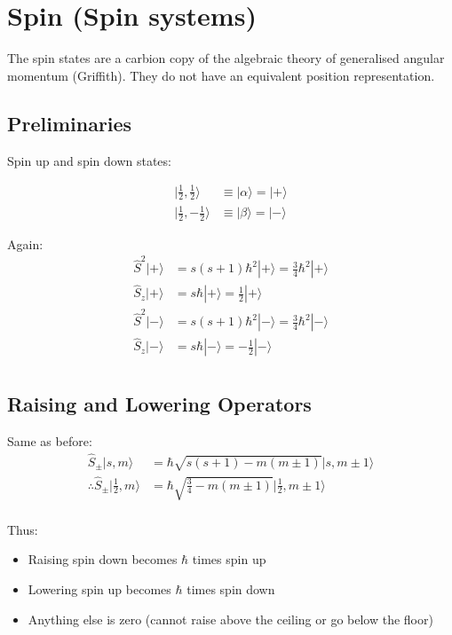 \documentclass[11pt]{article}
\begin{document}
\section{Spin (Spin \textonehalf{} systems)}
\label{sec:orgda054f5}

The spin states are a carbion copy of the algebraic theory of
generalised angular momentum (Griffith). They do not have an
equivalent position representation. 


\subsection{Preliminaries}
\label{sec:org7459ef0}

Spin up and spin down states:

\begin{align*}
 | \frac12, \frac12 \rangle &\equiv |\alpha\rangle  = |+\rangle\\
 | \frac12, -\frac12 \rangle &\equiv |\beta \rangle = |-\rangle
\end{align*}

Again:
\begin{align*}
\hat{S}^2 |+\rangle &= s(s+1)\hbar^2|+\rangle = \frac34\hbar^2|+\rangle\\
\hat{S}_z |+\rangle &= s\hbar|+\rangle = \frac12|+\rangle\\
\hat{S}^2 |-\rangle &= s(s+1)\hbar^2|-\rangle = \frac34\hbar^2|-\rangle\\
\hat{S}_z |-\rangle &= s\hbar|-\rangle = -\frac12|-\rangle\\
\end{align*}

\subsection{Raising and Lowering Operators}
\label{sec:orgfadefcb}

Same as before:
\begin{align*}
\hat{S}_\pm|s,m\rangle &= \hbar\sqrt{s(s+1)-m(m\pm1)}|s,m\pm1\rangle\\
\therefore \hat{S}_\pm|\frac12,m\rangle &= \hbar\sqrt{\frac34-m(m\pm1)}|\frac12,m\pm1\rangle\\
\end{align*}

Thus: 
\begin{itemize}
\item Raising spin down becomes \(\hbar\) times spin up
\item Lowering spin up becomes \(\hbar\) times spin down
\item Anything else is zero (cannot raise above the ceiling or go below
the floor)
\end{itemize}
\end{document}
